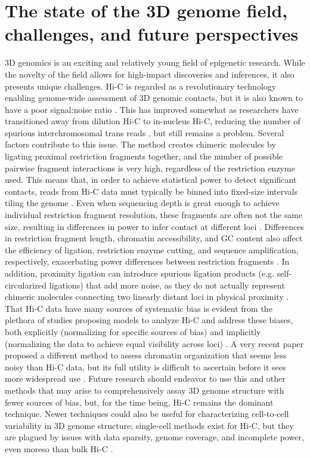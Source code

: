 \section{The state of the 3D genome field, challenges, and future perspectives}
3D genomics is an exciting and relatively young field of epigenetic research. While the novelty of the field allows for high-impact discoveries and inferences, it also presents unique challenges. Hi-C is regarded as a revolutionary technology enabling genome-wide assessment of 3D genomic contacts, but it is also known to have a poor signal:noise ratio \cite{Lajoie.2015, Yardimci.2019}. This has improved somewhat as researchers have transitioned away from dilution Hi-C to in-nucleus Hi-C, reducing the number of spurious interchromosomal trans reads \cite{Nagano.2015}, but still remains a problem. Several factors contribute to this issue. The method creates chimeric molecules by ligating proximal restriction fragments together, and the number of possible pairwise fragment interactions is very high, regardless of the restriction enzyme used. This means that, in order to achieve statistical power to detect significant contacts, reads from Hi-C data must typically be binned into fixed-size intervals tiling the genome \cite{Pal.2019}. Even when sequencing depth is great enough to achieve individual restriction fragment resolution, these fragments are often not the same size, resulting in differences in power to infer contact at different loci \cite{Yaffe.2011}. Differences in restriction fragment length, chromatin accessibility, and GC content also affect the efficiency of ligation, restriction enzyme cutting, and sequence amplification, respectively, exacerbating power differences between restriction fragments \cite{Yaffe.2011}. In addition, proximity ligation can introduce spurious ligation products (e.g. self-circularized ligations) that add more noise, as they do not actually represent chimeric molecules connecting two linearly distant loci in physical proximity \cite{Belaghzal.2017}. That Hi-C data have many sources of systematic bias is evident from the plethora of studies proposing models to analyze Hi-C and address these biases, both explicitly (normalizing for specific sources of bias) and implicitly (normalizing the data to achieve equal visibility across loci) \cite{Yaffe.2011, Hu.2012, Imakaev.2012, Rao.2014, Cournac.2012, Knight.2012, Lin.2012, Stansfield.2018, Wingett.2015, Servant.2015, Sauria.2015}. A very recent paper proposed a different method to assess chromatin organization that seems less noisy than Hi-C data, but its full utility is difficult to ascertain before it sees more widespread use \cite{You.2020}. Future research should endeavor to use this and other methods that may arise to comprehensively assay 3D genome structure with fewer sources of bias, but, for the time being, Hi-C remains the dominant technique. Newer techniques could also be useful for characterizing cell-to-cell variability in 3D genome structure; single-cell methods exist for Hi-C, but they are plagued by issues with data sparsity, genome coverage, and incomplete power, even moreso than bulk Hi-C \cite{Ramani.2017, Ramani.2019, Nagano.2013, Nagano.2015a, Zhou.2019a}.


